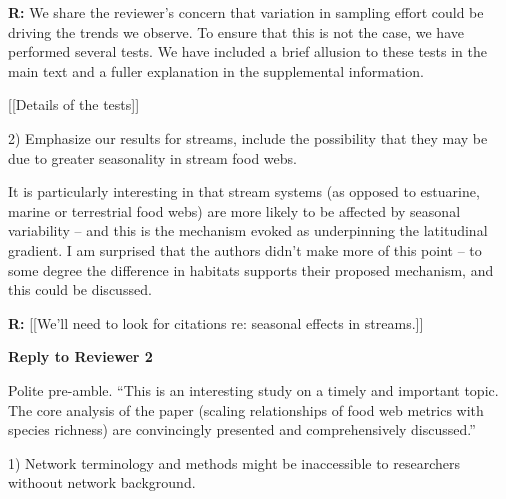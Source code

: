 \documentclass[12pt]{letter}
\newenvironment{refquote}{\bigskip \begin{it}}{\end{it}\smallskip}
\begin{document}
  \textbf{R:} We share the reviewer's concern that variation in sampling
  effort could be driving the trends we observe. To ensure that this is not
  the case, we have performed several tests. We have included a brief
  allusion to these tests in the main text and a fuller explanation in the
  supplemental information.

  [[Details of the tests]]


  \begin{quotation}


  \end{quotation}


   2) Emphasize our results for streams, include the possibility that they
   may be due to greater seasonality in stream food webs. 

  \begin{refquote}

    It is particularly interesting in that stream systems (as opposed to
    estuarine, marine or terrestrial food webs) are more likely to be affected
    by seasonal variability – and this is the mechanism evoked as underpinning
    the latitudinal gradient. I am surprised that the authors didn’t make more
    of this point – to some degree the difference in habitats supports their
    proposed mechanism, and this could be discussed.

  \end{refquote}


  \textbf{R:} [[We'll need to look for citations re: seasonal effects in streams.]]


  \begin{quotation}


  \end{quotation}


  \newpage

{\Large \bf Reply to Reviewer 2}

  Polite pre-amble.
  ``This is an interesting study on a timely and important topic. The core analysis of the paper (scaling relationships of food web metrics with species richness) are convincingly presented and comprehensively discussed.''


  1) Network terminology and methods might be inaccessible to researchers
  withoout network background.
\end{document}
